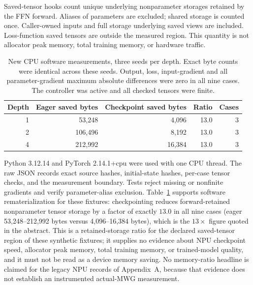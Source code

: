 Saved-tensor hooks count unique underlying nonparameter storages retained by
the FFN forward. Aliases of parameters are excluded; shared storage is counted
once. Caller-owned inputs and full storage underlying saved views are included.
Loss-function saved tensors are outside the measured region. This quantity is
not allocator peak memory, total training memory, or hardware traffic.

\begin{table}[t]
\centering\small
\caption{New CPU software measurements, three seeds per depth. Exact byte
counts were identical across these seeds. Output, loss, input-gradient and
all parameter-gradient maximum absolute differences were zero in all nine
cases. The controller was active and all checked tensors were finite.}
\label{tab:cpu}
\begin{tabular}{rrrrr}
\toprule
Depth & Eager saved bytes & Checkpoint saved bytes & Ratio & Cases \\
\midrule
1 & 53,248 & 4,096 & 13.0 & 3 \\
2 & 106,496 & 8,192 & 13.0 & 3 \\
4 & 212,992 & 16,384 & 13.0 & 3 \\
\bottomrule
\end{tabular}
\end{table}

Python 3.12.14 and PyTorch 2.14.1+cpu were used with one CPU thread. The raw
JSON records exact source hashes, initial-state hashes, per-case tensor checks,
and the measurement boundary. Tests reject missing or nonfinite gradients
and verify parameter-alias exclusion. Table~\ref{tab:cpu} supports software
rematerialization for these fixtures: checkpointing reduces
forward-retained nonparameter tensor storage by a factor of exactly $13.0$
in all nine cases (eager 53{,}248--212{,}992 bytes versus 4{,}096--16{,}384
bytes), which is the $13\times$ figure quoted in the abstract. This is a
retained-storage ratio for the declared saved-tensor region of these
synthetic fixtures; it supplies no evidence about NPU checkpoint speed,
allocator peak memory, total training memory, or trained-model quality, and
it must not be read as a device memory saving. No memory-ratio headline is
claimed for the legacy NPU records of Appendix~A, because that evidence does
not establish an instrumented actual-MWG measurement.

